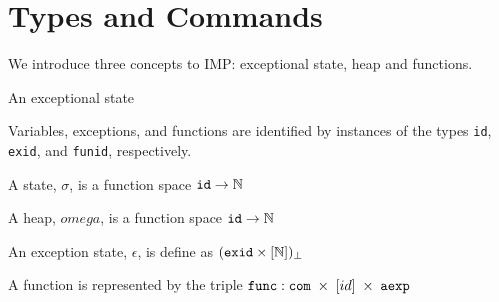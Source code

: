 \section{Types and Commands}

We introduce three concepts to IMP: exceptional state, heap and functions.

An exceptional state



Variables, exceptions, and functions are identified by instances of the types \verb|id|, \verb|exid|, and \verb|funid|, respectively.

A state, $\sigma$, is a function space $\verb|id| \rightarrow \mathbb{N}$

A heap, $omega$, is a function space $\verb|id| \rightarrow \mathbb{N}$

An exception state, $\epsilon$, is define as $(\verb|exid|\times[\mathbb{N}])_\bot$

A function is represented by the triple $\verb|func|: \verb|com| \; \times \; [id] \; \times \; \verb|aexp|$
